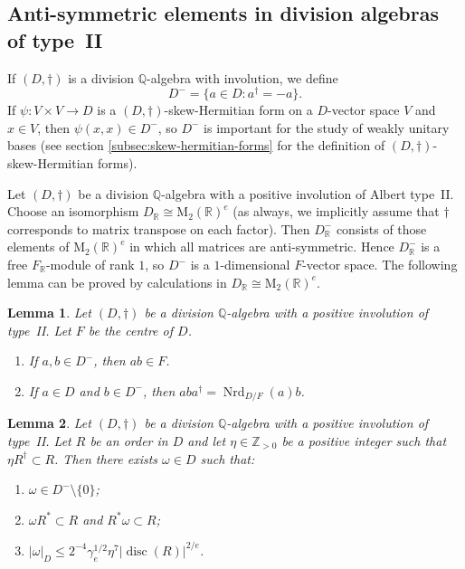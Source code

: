 \documentclass[JEP,XML,SOM,Unicode,NoFloatCountersInSection]{cedram}
\newenvironment{enumeratei}
{\bgroup\def\theenumi{\roman{enumi}}\def\theenumii{\alph{enumii}}\begin{enumerate}}
{\end{enumerate}\egroup}
\newcommand{\bQ}{\mathbb{Q}}
\newcommand{\bR}{\mathbb{R}}
\newcommand{\bZ}{\mathbb{Z}}
\newcommand{\rM}{\mathrm{M}}
\DeclareMathOperator{\disc}{disc}
\DeclareMathOperator{\Nrd}{Nrd}
\newcommand{\abs}[1]{\lvert #1 \rvert}
\newtheorem{lemma}{Lemma}[section]
\begin{document}
\subsection{Anti-symmetric elements in division algebras of type~II}

If $(D, \dag)$ is a division $\bQ$-algebra with involution, we define
\[
D^- = \{ a \in D : a^\dag = -a \}.
\]
If $\psi \colon V \times V \to D$ is a $(D,\dag)$-skew-Hermitian form on a $D$-vector space $V$ and $x \in V$, then $\psi(x,x) \in D^-$, so $D^-$ is important for the study of weakly unitary bases (see section \ref{subsec:skew-hermitian-forms} for the definition of $(D,\dag)$-skew-Hermitian forms).

Let $(D,\dag)$ be a division $\bQ$-algebra with a positive involution of Albert type~II.
Choose an isomorphism $D_\bR \cong \rM_2(\bR)^e$ (as always, we implicitly assume that $\dag$ corresponds to matrix transpose on each factor).
Then $D_\bR^-$ consists of those elements of $\rM_2(\bR)^e$ in which all matrices are anti-symmetric.
Hence $D_\bR^-$ is a free $F_\bR$-module of rank $1$, so $D^-$ is a $1$-dimensional $F$-vector space. The following lemma can be proved by calculations in $D_\bR \cong \rM_2(\bR)^e$.

\begin{lemma} \label{action-on-antisymm}
Let $(D, \dag)$ be a division $\bQ$-algebra with a positive involution of type~II.
Let $F$ be the centre of $D$.
\begin{enumeratei}
\item\label{action-on-antisymmi} If $a, b \in D^-$, then $ab \in F$.
\item\label{action-on-antisymmii} If $a \in D$ and $b \in D^-$, then $aba^\dag = \Nrd_{D/F}(a)b$.
\end{enumeratei}
\end{lemma}

\begin{lemma} \label{small-antisymm-star}
Let $(D, \dag)$ be a division $\bQ$-algebra with a positive involution of type~II.
Let $R$ be an order in $D$ and let $\eta \in \bZ_{>0}$ be a positive integer such that $\eta R^\dag \subset R$.
Then there exists $\omega \in D$ such that:
\begin{enumeratei}
\item $\omega \in D^- \setminus \{0\}$;
\item $\omega R^* \subset R$ and $R^* \omega \subset R$;
\item $\abs{\omega}_D \leq 2^{-4} \gamma_e^{1/2} \eta^7 \abs{\disc(R)}^{2/e}$.
\end{enumeratei}
\end{lemma}
\end{document}
